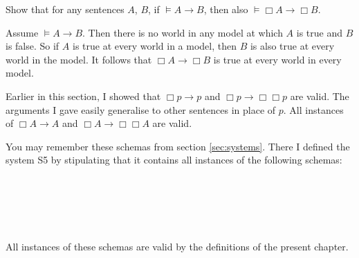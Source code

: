 \begin{exercise}
  Show that for any sentences $A$, $B$, if $\models A \to B$, then also
  $\models \Box A \to \Box B$.
\end{exercise}
\begin{solution}
  Assume $\models A \to B$. Then there is no world in any model at which $A$ is
  true and $B$ is false. So if $A$ is true at every world in a model, then $B$
  is also true at every world in the model. It follows that $\Box A \to \Box B$
  is true at every world in every model.
\end{solution}

Earlier in this section, I showed that $\Box p \to p$ and
$\Box p \to \Box\Box p$ are valid. The arguments I gave easily generalise to
other sentences in place of $p$. All instances of $\Box A \to A$ and
$\Box A \to \Box\Box A$ are valid.

You may remember these schemas from section \ref{sec:systems}. There I defined
the system S5 by stipulating that it contains all instances of the following
schemas:
%
\begin{principles}
  \\
  \\
  \\
  \\
\end{principles}
%
All instances of these schemas are valid by the definitions of the present
chapter.


